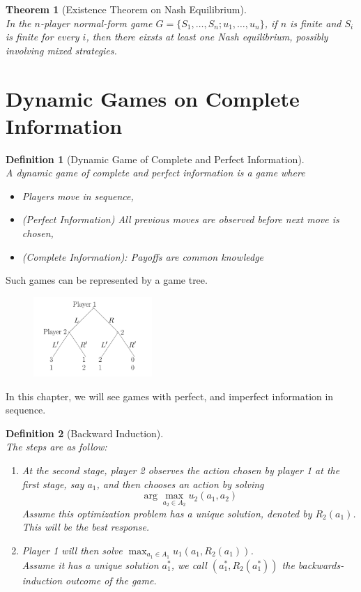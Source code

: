 \documentclass[12pt]{article}
\newtheorem{definition}{Definition}[section]
\newtheorem{theorem}{Theorem}[section]
\theoremstyle{definition}
\begin{document}
\begin{theorem}[Existence Theorem on Nash Equilibrium]
\hfill\\\normalfont In the $n$-player normal-form game $G=\{S_1,\ldots, S_n; u_1,\ldots, u_n\}$, if $n$ is \textit{finite} and $S_i$ is \textit{finite} for every $i$, then there eixsts at least one Nash equilibrium, possibly involving mixed strategies.
\end{theorem}
\section{Dynamic Games on Complete Information}
\begin{definition}[Dynamic Game of Complete and Perfect Information]
\hfill\\\normalfont A dynamic game of complete and perfect information is a game where
\begin{itemize}
  \item Players move in sequence, 
  \item (Perfect Information) All previous moves are observed before next move is chosen,
  \item (Complete Information): Payoffs are common knowledge
\end{itemize}
\end{definition}
Such games can be represented by a game tree.\\
\begin{figure}[h]
\centering
\includegraphics[width=0.4\textwidth]{2-1.jpg}
\end{figure}
In this chapter, we will see games with perfect, and imperfect information in sequence.
\begin{definition}[Backward Induction]
\hfill\\\normalfont The steps are as follow:
\begin{enumerate}
  \item At the second stage, player 2 observes the action chosen by player 1 at the first stage, say $a_1$, and then chooses an action by solving 
  \[
\arg \max_{a_2\in A_2} u_2(a_1, a_2)
  \]
  Assume this optimization problem has a unique solution, denoted by $R_2(a_1)$. This will be the best response.
  \item Player 1 will then solve $\max_{a_1\in A_1}u_1(a_1, R_2(a_1))$.\\
  Assume it has a unique solution $a_1^\ast$, we call $(a_1^\ast, R_2(a_1^\ast))$ the backwards-induction outcome of the game.
\end{enumerate}
\end{definition}
\end{document}

